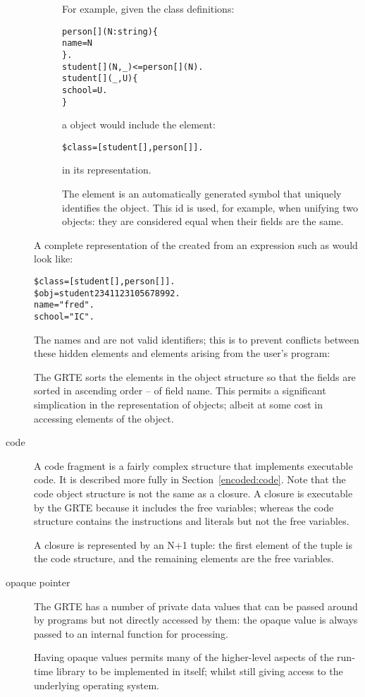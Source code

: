 \begin{description}
\begin{description}
For example, given the class definitions:
\begin{alltt}
person[](N:string)\{
  name=N
\}.
student[](N,\_)<=person[](N).
student[](\_,U)\{
 school=U.
\}
\end{alltt}
a  object would include the element:
\begin{alltt}
\$class = [student[],person[]].
\end{alltt}
in its representation.
\item[\q{\$obj}]
The  element is an automatically generated symbol that uniquely identifies the object. This id is used, for example, when unifying two objects: they are considered equal when their  fields are the same.
\end{description}
A complete representation of the  created from an expression such as  would look like:
\begin{alltt}
\$class = [student[],person[]].
\$obj = student2341123105678992.
name="fred".
school="IC".
\end{alltt}
The names  and  are not valid identifiers; this is to prevent conflicts between these hidden elements and elements arising from the user's program:

The GRTE sorts the elements in the object structure so that the fields are sorted in ascending order -- of field name. This permits a significant simplication in the representation of objects; albeit at some cost in accessing elements of the object.

\item[code]
A code fragment is a fairly complex structure that implements executable code. It is described more fully in Section~\vref{encoded:code}. Note that the code object structure is not the same as a closure. A closure is executable by the GRTE because it includes the free variables; whereas the code structure contains the instructions and literals but not the free variables.

A closure is represented by an N+1 tuple: the first element of the tuple is the code structure, and the remaining elements are the free variables.

\item[opaque pointer]
The GRTE has a number of private data values that can be passed around by \go programs but not directly accessed by them: the opaque value is always passed to an internal function for processing.

Having opaque values permits many of the higher-level aspects of the run-time library to be implemented in \go itself; whilst still giving access to the underlying operating system.


\end{description}
